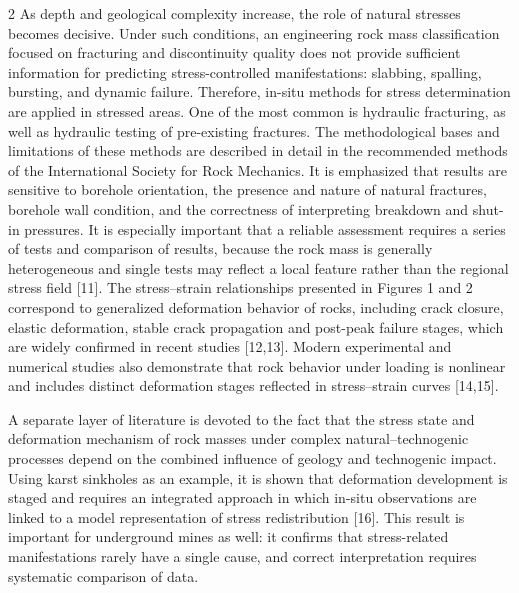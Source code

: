 \begin{multicols}{2}
As depth and geological complexity increase, the role of natural
stresses becomes decisive. Under such conditions, an engineering rock
mass classification focused on fracturing and discontinuity quality does
not provide sufficient information for predicting stress-controlled
manifestations: slabbing, spalling, bursting, and dynamic failure.
Therefore, in-situ methods for stress determination are applied in
stressed areas. One of the most common is hydraulic fracturing, as well
as hydraulic testing of pre-existing fractures. The methodological bases
and limitations of these methods are described in detail in the
recommended methods of the International Society for Rock Mechanics. It
is emphasized that results are sensitive to borehole orientation, the
presence and nature of natural fractures, borehole wall condition, and
the correctness of interpreting breakdown and shut-in pressures. It is
especially important that a reliable assessment requires a series of
tests and comparison of results, because the rock mass is generally
heterogeneous and single tests may reflect a local feature rather than
the regional stress field {[}11{]}. The stress--strain relationships
presented in Figures 1 and 2 correspond to generalized deformation
behavior of rocks, including crack closure, elastic deformation, stable
crack propagation and post-peak failure stages, which are widely
confirmed in recent studies {[}12,13{]}. Modern experimental and
numerical studies also demonstrate that rock behavior under loading is
nonlinear and includes distinct deformation stages reflected in
stress--strain curves {[}14,15{]}.

A separate layer of literature is devoted to the fact that the stress
state and deformation mechanism of rock masses under complex
natural--technogenic processes depend on the combined influence of
geology and technogenic impact. Using karst sinkholes as an example, it
is shown that deformation development is staged and requires an
integrated approach in which in-situ observations are linked to a model
representation of stress redistribution {[}16{]}. This result is
important for underground mines as well: it confirms that stress-related
manifestations rarely have a single cause, and correct interpretation
requires systematic comparison of data.


\end{multicols}
